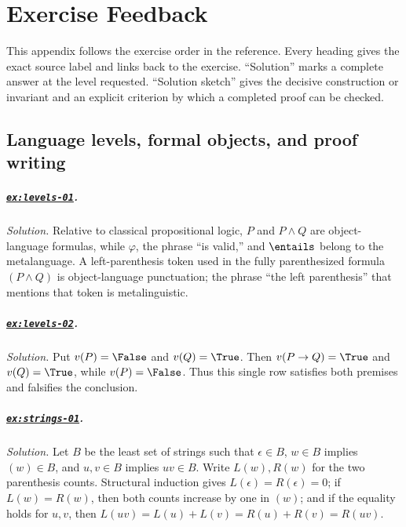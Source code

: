 \chapter{Exercise Feedback}
\label{ch:exercise-feedback}
\label{app:exercise-feedback}

This appendix follows the exercise order in the reference.  Every heading gives
the exact source label and links back to the exercise.  ``Solution'' marks a
complete answer at the level requested.  ``Solution sketch'' gives the decisive
construction or invariant and an explicit criterion by which a completed proof
can be checked.

\section{Language levels, formal objects, and proof writing}

\paragraph{\hyperref[ex:levels-01]{\texttt{ex:levels-01}}.}
\textit{Solution.}  Relative to classical propositional logic, \(P\) and
\(P\land Q\) are object-language formulas, while \(\varphi\), the phrase ``is
valid,'' and \(\entails\) belong to the metalanguage.  A left-parenthesis token
used in the fully parenthesized formula \((P\land Q)\) is object-language
punctuation; the phrase ``the left parenthesis'' that mentions that token is
metalinguistic.

\paragraph{\hyperref[ex:levels-02]{\texttt{ex:levels-02}}.}
\textit{Solution.}  Put \(v(P)=\False\) and \(v(Q)=\True\).  Then
\(v(P\to Q)=\True\) and \(v(Q)=\True\), while \(v(P)=\False\).  Thus this
single row satisfies both premises and falsifies the conclusion.

\paragraph{\hyperref[ex:strings-01]{\texttt{ex:strings-01}}.}
\textit{Solution.}  Let \(B\) be the least set of strings such that
\(\epsilon\in B\), \(w\in B\) implies \((w)\in B\), and \(u,v\in B\) implies
\(uv\in B\).  Write \(L(w),R(w)\) for the two parenthesis counts.  Structural
induction gives \(L(\epsilon)=R(\epsilon)=0\); if \(L(w)=R(w)\), then both
counts increase by one in \((w)\); and if the equality holds for \(u,v\), then
\(L(uv)=L(u)+L(v)=R(u)+R(v)=R(uv)\).

